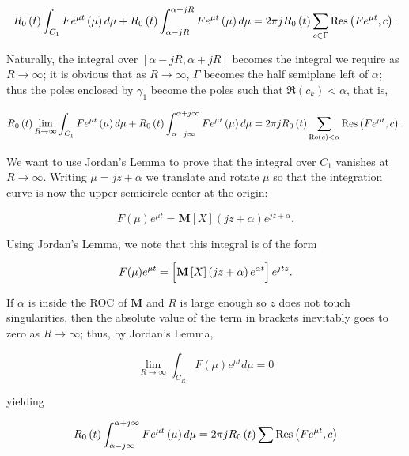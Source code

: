 \begin{equation} R_0\left(t\right)\int_{C_1} Fe^{\mu t}\left(\mu\right)d\mu + R_0\left(t\right)\int_{\alpha - jR}^{\alpha + jR} Fe^{\mu t}\left(\mu\right)d\mu = 2\pi j R_0\left(t\right)\sum_{c\in\Gamma} \operatorname{Res}\left(Fe^{\mu t},c\right) .\end{equation}

	Naturally, the integral over $\left[\alpha - jR,\alpha + jR\right]$ becomes the integral we require as $R\to \infty$; it is obvious that as $R\to\infty$, $\Gamma$ becomes the half semiplane left of $\alpha$; thus the poles enclosed by $\gamma_1$ become the poles such that $\Re\left(c_k\right) < \alpha$, that is,

\begin{equation} R_0\left(t\right)\lim_{R\to\infty} \int_{C_1} Fe^{\mu t}\left(\mu\right)d\mu + R_0\left(t\right)\int_{\alpha - j\infty}^{\alpha + j\infty} Fe^{\mu t}\left(\mu\right)d\mu = 2\pi j R_0\left(t\right)\sum_{\operatorname{Re}\left(c\right) < \alpha} \operatorname{Res}\left(Fe^{\mu t},c\right) .\end{equation}

	We want to use Jordan's Lemma to prove that the integral over $C_1$ vanishes at $R\to \infty$. Writing $\mu = jz + \alpha$ we translate and rotate $\mu$ so that the integration curve is now the upper semicircle center at the origin:

\begin{equation} F(\mu)e^{\mu t} = \mathbf{M}\left[X\right]\left(jz + \alpha\right) e^{jz + \alpha}. \end{equation}

	Using Jordan's Lemma, we note that this integral is of the form

\begin{equation} F(\mu)e^{\mu t} = \left[\raisebox{4mm}{} \mathbf{M}\left[X\right]\left(jz + \alpha\right) e^{\alpha t}\right]e^{jtz}. \end{equation}

	If $\alpha$ is inside the ROC of $\mathbf{M}$ and $R$ is large enough so $z$ does not touch singularities, then the absolute value of the term in brackets inevitably goes to zero as $R\to\infty$; thus, by Jordan's Lemma,

\begin{equation} \lim_{R\to\infty} \int_{C_R} F(\mu)e^{\mu t}d\mu = 0 \end{equation}

	\noindent yielding

\begin{equation} R_0\left(t\right)\int_{\alpha - j\infty}^{\alpha + j\infty} Fe^{\mu t}\left(\mu\right)d\mu = 2\pi j R_0\left(t\right)\sum \operatorname{Res}\left(Fe^{\mu t},c\right) \end{equation}

